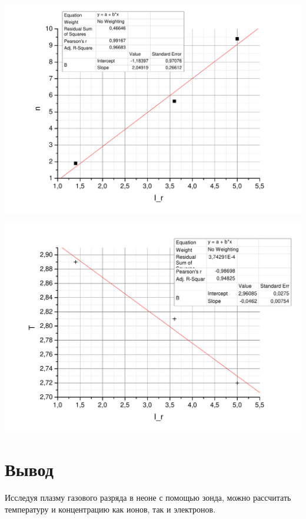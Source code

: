 \documentclass[a4paper,12pt]{article}
\begin{document}
		\includegraphics[width=0.7\linewidth]{ni} 

		\includegraphics[width=0.7\linewidth]{ti} 

		
		\section{Вывод}
			Исследуя плазму газового разряда в неоне с помощью зонда, можно рассчитать температуру и концентрацию как ионов, так и электронов.
		
\end{document}
